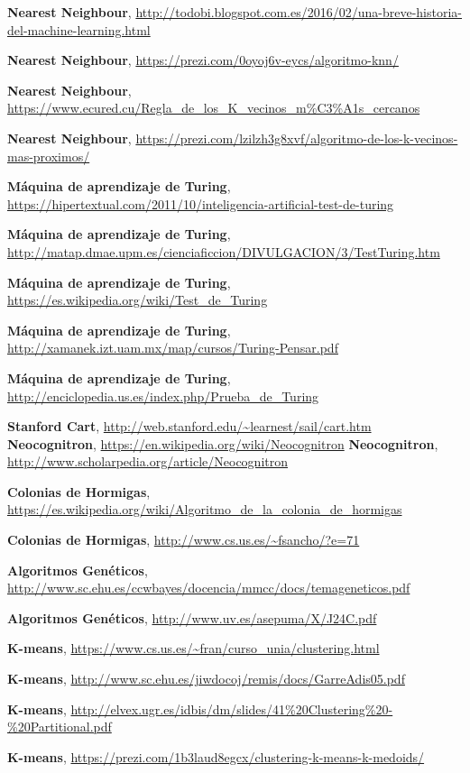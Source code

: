\documentclass[a4paper, 11pt]{article} %
\begin{document}
\begin{thebibliography}{9}
 	\textbf{Nearest Neighbour},
 \url{http://todobi.blogspot.com.es/2016/02/una-breve-historia-del-machine-learning.html}

 	\textbf{Nearest Neighbour},
 \url{https://prezi.com/0oyoj6v-eycs/algoritmo-knn/}

 	\textbf{Nearest Neighbour},
 \url{https://www.ecured.cu/Regla_de_los_K_vecinos_m%C3%A1s_cercanos}

 	\textbf{Nearest Neighbour},
 \url{https://prezi.com/lzilzh3g8xvf/algoritmo-de-los-k-vecinos-mas-proximos/}

 	\textbf{Máquina de aprendizaje de Turing},
 \url{https://hipertextual.com/2011/10/inteligencia-artificial-test-de-turing}

 	\textbf{Máquina de aprendizaje de Turing},
 \url{http://matap.dmae.upm.es/cienciaficcion/DIVULGACION/3/TestTuring.htm}

 	\textbf{Máquina de aprendizaje de Turing},
 \url{https://es.wikipedia.org/wiki/Test_de_Turing}

 	\textbf{Máquina de aprendizaje de Turing},
 \url{http://xamanek.izt.uam.mx/map/cursos/Turing-Pensar.pdf}

 	\textbf{Máquina de aprendizaje de Turing},
 \url{http://enciclopedia.us.es/index.php/Prueba_de_Turing}

    \textbf{Stanford Cart},
    \url{http://web.stanford.edu/~learnest/sail/cart.htm}
 \textbf{Neocognitron},
 \url{https://en.wikipedia.org/wiki/Neocognitron}
 \textbf{Neocognitron},
 \url{http://www.scholarpedia.org/article/Neocognitron}

	 \textbf{Colonias de Hormigas},
 \url{https://es.wikipedia.org/wiki/Algoritmo_de_la_colonia_de_hormigas}

	 \textbf{Colonias de Hormigas},
 \url{http://www.cs.us.es/~fsancho/?e=71}

	 \textbf{Algoritmos Genéticos},
 \url{http://www.sc.ehu.es/ccwbayes/docencia/mmcc/docs/temageneticos.pdf}

	 \textbf{Algoritmos Genéticos},
 \url{http://www.uv.es/asepuma/X/J24C.pdf}

	 \textbf{K-means},
 \url{https://www.cs.us.es/~fran/curso_unia/clustering.html}

	 \textbf{K-means},
 \url{http://www.sc.ehu.es/jiwdocoj/remis/docs/GarreAdis05.pdf}

	 \textbf{K-means},
 \url{http://elvex.ugr.es/idbis/dm/slides/41%20Clustering%20-%20Partitional.pdf}

	 \textbf{K-means},
 \url{https://prezi.com/1b3laud8egcx/clustering-k-means-k-medoids/}
\end{thebibliography}
\end{document}
